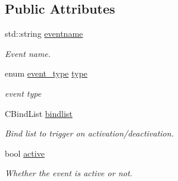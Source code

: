 \subsection*{Public Attributes}
\begin{DoxyCompactItemize}
\item 
\hypertarget{classCEvent_a9543179cd76d08369201e992ca41728c}{std\-::string \hyperlink{classCEvent_a9543179cd76d08369201e992ca41728c}{eventname}}\label{classCEvent_a9543179cd76d08369201e992ca41728c}

\begin{DoxyCompactList}\small\item\em Event name. \end{DoxyCompactList}\item 
\hypertarget{classCEvent_a5612c4e4e1d0cfc08e1640fee8bacf85}{enum \hyperlink{classCEvent_a93a65775636793dfcabe38d14739c2bd}{event\-\_\-type} \hyperlink{classCEvent_a5612c4e4e1d0cfc08e1640fee8bacf85}{type}}\label{classCEvent_a5612c4e4e1d0cfc08e1640fee8bacf85}

\begin{DoxyCompactList}\small\item\em event type \end{DoxyCompactList}\item 
\hypertarget{classCEvent_a0c900c0aab7bf38d7ac8769d5e4f6a5a}{C\-Bind\-List \hyperlink{classCEvent_a0c900c0aab7bf38d7ac8769d5e4f6a5a}{bindlist}}\label{classCEvent_a0c900c0aab7bf38d7ac8769d5e4f6a5a}

\begin{DoxyCompactList}\small\item\em Bind list to trigger on activation/deactivation. \end{DoxyCompactList}\item 
\hypertarget{classCEvent_af1e4934eb75e5636f81918c13983e2e3}{bool \hyperlink{classCEvent_af1e4934eb75e5636f81918c13983e2e3}{active}}\label{classCEvent_af1e4934eb75e5636f81918c13983e2e3}

\begin{DoxyCompactList}\small\item\em Whether the event is active or not. \end{DoxyCompactList}\end{DoxyCompactItemize}
